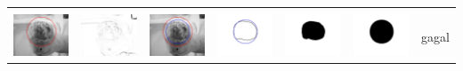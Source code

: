 \begin{table}[H]
\begin{tabular}{|m{0.7in}|m{0.7in}|m{0.7in}|m{0.7in}|m{0.7in}|m{0.7in}|m{0.7in}|}
		&  &  & & & &  \\
		\includegraphics[width=0.7in]{dataset/dataset_3/luka_kuning/ready/42_integer_init.jpg}&
		\includegraphics[width=0.7in]{dataset/dataset_3/luka_kuning/ready/42_integer_ext.jpg}&
		\includegraphics[width=0.7in]{dataset/dataset_3/luka_kuning/ready/42_integer_result.jpg}&
		\includegraphics[width=0.7in]{dataset/dataset_3/luka_kuning/ready/42_gt_r_integer.jpg}&
		\includegraphics[width=0.7in]{dataset/dataset_3/luka_kuning/ready/42_r.jpg}&
		\includegraphics[width=0.7in]{dataset/dataset_3/luka_kuning/ready/42_integer_r.jpg}&
		gagal\\
		\hline
	\end{tabular}
\end{table}

